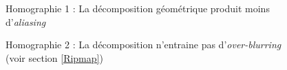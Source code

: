 \begin{figure}
\caption{Homographie 1 : La décomposition géométrique produit moins d'\emph{aliasing}}
\label{Homo1}
\end{figure}

\begin{figure}
\caption{Homographie 2 : La décomposition n'entraine pas d'\emph{over-blurring} (voir section \ref{Ripmap})}
\label{Homo2}
\end{figure}

